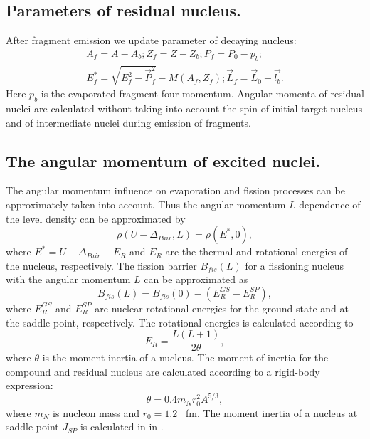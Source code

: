 \subsection{Parameters of residual nucleus.}

\hspace{1.0em}After fragment emission we  update parameter
of decaying nucleus:
\begin{equation}
\label{SFE21} 
\begin{array}{c}
A_f=A-A_b; Z_f=Z-Z_b; P_f = P_0 - p_b; \\ 
E_f^{*}=\sqrt{E_f^2-\vec{P}^2_f} - M(A_f,Z_f); \vec{L}_f = \vec{L}_0-\vec{l_b}. 
\end{array}
\end{equation}
Here $p_b$ is the evaporated fragment four momentum.
Angular momenta of residual nuclei are calculated without taking into
account the spin of initial target nucleus and
 of intermediate nuclei during emission
of fragments.

\subsection{The angular momentum of excited nuclei.}

\hspace{1.0em}The angular momentum influence on evaporation and 
fission processes can be approximately taken into account. 
Thus the angular momentum $L$ 
dependence of the level density can be approximated \cite{ICC80}
by 
\begin{equation}
\label{SFE22}\rho(U-\Delta_{Pair},L)=\rho(E^{*},0),
\end{equation}
 where $E^{*}=U-\Delta_{Pair}-E_R$
 and $E_R$ are 
the thermal and rotational energies of the nucleus, respectively. 
The fission barrier $B_{fis}(L)$ for a fissioning nucleus with the angular
momentum $L$ can be approximated as
\begin{equation}
\label{SFE23} B_{fis}(L)=B_{fis}(0) - (E^{GS}_{R} - E^{SP}_R),
\end{equation}
where $E^{GS}_{R}$ and $E^{SP}_R$ are nuclear rotational energies for 
the ground state and at the saddle-point, respectively.
The rotational energies is calculated according to
\begin{equation}
\label{SFE24} E_R=\frac{L(L+1)}{2\theta},
\end{equation}
where $\theta$ is the moment inertia of a nucleus. The moment of inertia for the 
compound and residual nucleus are calculated according to a rigid-body 
expression:
\begin{equation}
\label{SFE25} \theta=0.4m_Nr^2_0A^{5/3},
\end{equation}
where $m_N$ is nucleon mass and $r_0 = 1.2$ \ fm.
The moment inertia of a nucleus at saddle-point $J_{SP}$ is calculated in 
 in \cite{CS63}.
